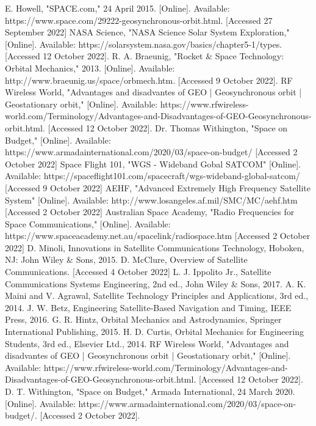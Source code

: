 \documentclass[conference]{IEEEtran}
\begin{document}
\begin{thebibliography}{00}
 E. Howell, "SPACE.com," 24 April 2015. [Online]. Available: https://www.space.com/29222-geosynchronous-orbit.html. [Accessed 27 September 2022]
 NASA Science, "NASA Science Solar System Exploration," [Online]. Available: https://solarsystem.nasa.gov/basics/chapter5-1/types. [Accessed 12 October 2022].
 R. A. Braeunig, "Rocket \& Space Technology: Orbital Mechanics," 2013. [Online]. Available: http://www.braeunig.us/space/orbmech.htm. [Accessed 9 October 2022].
 RF Wireless World, "Advantages and disadvantes of GEO | Geosynchronous orbit | Geostationary orbit," [Online]. Available: https://www.rfwireless-world.com/Terminology/Advantages-and-Disadvantages-of-GEO-Geosynchronous-orbit.html. [Accessed 12 October 2022].
 Dr. Thomas Withington, "Space on Budget," [Online]. Available: https://www.armadainternational.com/2020/03/space-on-budget/ [Accessed 2 October 2022]
 Space Flight 101, "WGS - Wideband Gobal SATCOM" [Online]. Available: https://spaceflight101.com/spacecraft/wgs-wideband-global-satcom/ [Accessed 9 October 2022]
 AEHF, "Advanced Extremely High Frequency Satellite System" [Online]. Available: http://www.losangeles.af.mil/SMC/MC/aehf.htm [Accessed 2 October 2022]
 Australian Space Academy, "Radio Frequencies for Space Communications," [Online]. Available: https://www.spaceacademy.net.au/spacelink/radiospace.htm [Accessed 2 October 2022]
 D. Minoli, Innovations in Satellite Communications Technology, Hoboken, NJ: John Wiley \& Sons, 2015.
 D. McClure, Overview of Satellite Communications. [Accessed 4 October 2022]
 L. J. Ippolito Jr., Satellite Communications Systems Engineering, 2nd ed., John Wiley \& Sons, 2017.
 A. K. Maini and V. Agrawal, Satellite Technology Principles and Applications, 3rd ed., 2014.
 J. W. Betz, Engineering Satellite-Based Navigation and Timing, IEEE Press, 2016.
 G. R. Hintz, Orbital Mechanics and Astrodynamics, Springer International Publishing, 2015.
 H. D. Curtis, Orbital Mechanics for Engineering Students, 3rd ed., Elsevier Ltd., 2014. 
 RF Wireless World, "Advantages and disadvantes of GEO | Geosynchronous orbit | Geostationary orbit," [Online]. Available: https://www.rfwireless-world.com/Terminology/Advantages-and-Disadvantages-of-GEO-Geosynchronous-orbit.html. [Accessed 12 October 2022].
 D. T. Withington, "Space on Budget," Armada International, 24 March 2020. [Online]. Available: https://www.armadainternational.com/2020/03/space-on-budget/. [Accessed 2 October 2022].

\end{thebibliography}
\end{document}

